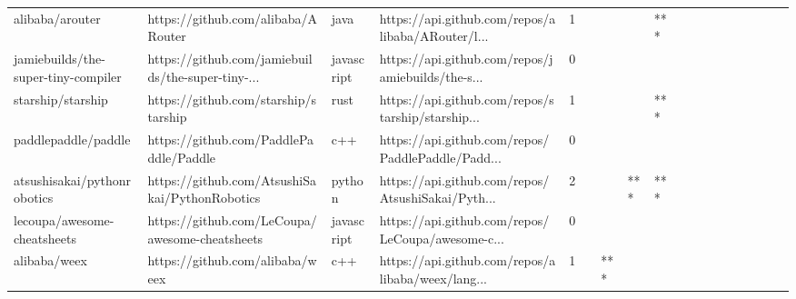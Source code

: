 \begin{tabular}{llllrlllllllllllll}
alibaba/arouter                                    &                 https://github.com/alibaba/ARouter &              java &  https://api.github.com/repos/alibaba/ARouter/l... &       1 &         &        &           &            *** &                 &        &           &           &          &          &       &              &          \\
jamiebuilds/the-super-tiny-compiler                &  https://github.com/jamiebuilds/the-super-tiny-... &        javascript &  https://api.github.com/repos/jamiebuilds/the-s... &       0 &         &        &           &                &                 &        &           &           &          &          &       &              &          \\
starship/starship                                  &               https://github.com/starship/starship &              rust &  https://api.github.com/repos/starship/starship... &       1 &         &        &           &            *** &                 &        &           &           &          &          &       &              &          \\
paddlepaddle/paddle                                &             https://github.com/PaddlePaddle/Paddle &               c++ &  https://api.github.com/repos/PaddlePaddle/Padd... &       0 &         &        &           &                &                 &        &           &           &          &          &       &              &          \\
atsushisakai/pythonrobotics                        &     https://github.com/AtsushiSakai/PythonRobotics &            python &  https://api.github.com/repos/AtsushiSakai/Pyth... &       2 &         &        &       *** &            *** &                 &        &           &           &          &          &       &              &          \\
lecoupa/awesome-cheatsheets                        &     https://github.com/LeCoupa/awesome-cheatsheets &        javascript &  https://api.github.com/repos/LeCoupa/awesome-c... &       0 &         &        &           &                &                 &        &           &           &          &          &       &              &          \\
alibaba/weex                                       &                    https://github.com/alibaba/weex &               c++ &  https://api.github.com/repos/alibaba/weex/lang... &       1 &         &    *** &           &                &                 &        &           &           &          &          &       &              &          \\

\end{tabular}
